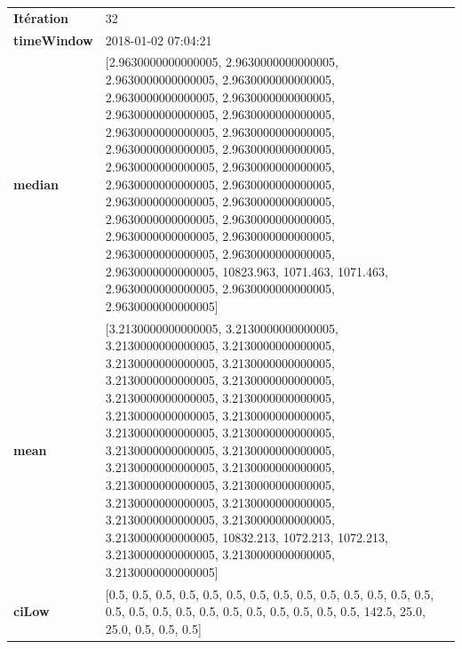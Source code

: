 \begin{table}[H]
	\centering
	\begin{tabularx}{\textwidth}{lX}
		\textbf{Itération}& 32\\
		\textbf{timeWindow}& 2018-01-02 07:04:21 \\
		\textbf{median}& [2.9630000000000005, 2.9630000000000005, 2.9630000000000005, 2.9630000000000005, 2.9630000000000005, 2.9630000000000005, 2.9630000000000005, 2.9630000000000005, 2.9630000000000005, 2.9630000000000005, 2.9630000000000005, 2.9630000000000005, 2.9630000000000005, 2.9630000000000005, 2.9630000000000005, 2.9630000000000005, 2.9630000000000005, 2.9630000000000005, 2.9630000000000005, 2.9630000000000005, 2.9630000000000005, 2.9630000000000005, 2.9630000000000005, 2.9630000000000005, 2.9630000000000005, 10823.963, 1071.463, 1071.463, 2.9630000000000005, 2.9630000000000005, 2.9630000000000005] \\
		\textbf{mean} & [3.2130000000000005, 3.2130000000000005, 3.2130000000000005, 3.2130000000000005, 3.2130000000000005, 3.2130000000000005, 3.2130000000000005, 3.2130000000000005, 3.2130000000000005, 3.2130000000000005, 3.2130000000000005, 3.2130000000000005, 3.2130000000000005, 3.2130000000000005, 3.2130000000000005, 3.2130000000000005, 3.2130000000000005, 3.2130000000000005, 3.2130000000000005, 3.2130000000000005, 3.2130000000000005, 3.2130000000000005, 3.2130000000000005, 3.2130000000000005, 3.2130000000000005, 10832.213, 1072.213, 1072.213, 3.2130000000000005, 3.2130000000000005, 3.2130000000000005] \\
		\textbf{ciLow}& [0.5, 0.5, 0.5, 0.5, 0.5, 0.5, 0.5, 0.5, 0.5, 0.5, 0.5, 0.5, 0.5, 0.5, 0.5, 0.5, 0.5, 0.5, 0.5, 0.5, 0.5, 0.5, 0.5, 0.5, 0.5, 142.5, 25.0, 25.0, 0.5, 0.5, 0.5] \\
		
							\end{tabularx} 
						\end{table}
						
